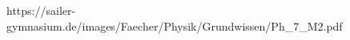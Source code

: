 \documentclass[preview]{standalone}
\begin{document}
\begin{center}
https://sailer-gymnasium.de/images/Faecher/Physik/Grundwissen/Ph_7_M2.pdf
\end{center}
\end{document}
